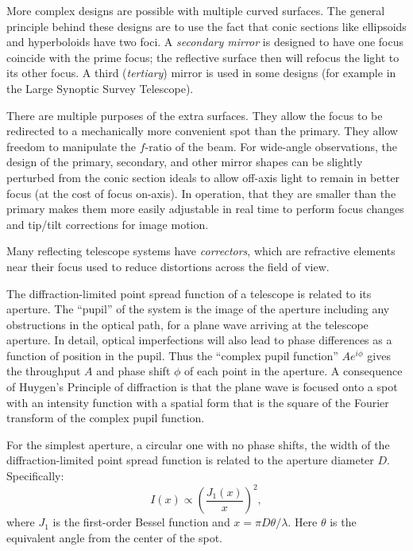 More complex designs are possible with multiple curved surfaces. The
general principle behind these designs are to use the fact that conic
sections like ellipsoids and hyperboloids have two foci. A {\it
secondary mirror} is designed to have one focus coincide with the
prime focus; the reflective surface then will refocus the light to its
other focus. A third ({\it tertiary}) mirror is used in some designs
(for example in the Large Synoptic Survey Telescope).

There are multiple purposes of the extra surfaces. They allow the
focus to be redirected to a mechanically more convenient spot than the
primary. They allow freedom to manipulate the $f$-ratio of the
beam. For wide-angle observations, the design of the primary,
secondary, and other mirror shapes can be slightly perturbed from the
conic section ideals to allow off-axis light to remain in better focus
(at the cost of focus on-axis). In operation, that they are smaller
than the primary makes them more easily adjustable in real time to
perform focus changes and tip/tilt corrections for image motion.

Many reflecting telescope systems have {\it correctors}, which are
refractive elements near their focus used to reduce distortions across
the field of view.

The diffraction-limited point spread function of a telescope is
related to its aperture. The ``pupil'' of the system is the image of
the aperture including any obstructions in the optical path, for a
plane wave arriving at the telescope aperture. In detail, optical
imperfections will also lead to phase differences as a function of
position in the pupil. Thus the ``complex pupil function'' $A
e^{i\phi}$ gives the throughput $A$ and phase shift $\phi$ of each
point in the aperture. A consequence of Huygen's Principle of
diffraction is that the plane wave is focused onto a spot with an
intensity function with a spatial form that is the square of the
Fourier transform of the complex pupil function.

For the simplest aperture, a circular one with no phase shifts, the
width of the diffraction-limited point spread function is related to
the aperture diameter $D$. Specifically:
\begin{equation}
\label{eq:psf_tophat}
I(x) \propto \left(\frac{J_1(x)}{x}\right)^2,
\end{equation}
where $J_1$ is the first-order Bessel function and $x=\pi D \theta
/\lambda$. Here $\theta$ is the equivalent angle from the center of
the spot. 

